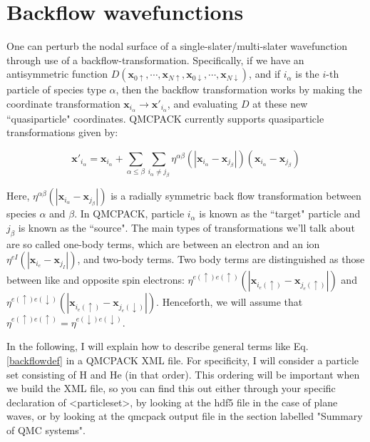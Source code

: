 \section{Backflow wavefunctions}

\label{sec:backflow}

One can perturb the nodal surface of a single-slater/multi-slater wavefunction through use of a backflow-transformation.  Specifically, if we have an antisymmetric function $D(\mathbf{x}_{0\uparrow},\cdots,\mathbf{x}_{N\uparrow}, \mathbf{x}_{0\downarrow},\cdots,\mathbf{x}_{N\downarrow})$, and if $i_\alpha$ is the $i$-th particle of species type $\alpha$, then the backflow transformation works by making the coordinate transformation $\mathbf{x}_{i_\alpha} \to \mathbf{x}'_{i_\alpha}$, and evaluating $D$ at these new ``quasiparticle" coordinates.  QMCPACK currently supports quasiparticle transformations given by:

\begin{equation}\label{backflowdef}
\mathbf{x}'_{i_\alpha}=\mathbf{x}_{i_\alpha}+\sum_{\alpha \leq \beta} \sum_{i_\alpha \neq j_\beta} \eta^{\alpha\beta}(|\mathbf{x}_{i_\alpha}-\mathbf{x}_{j_\beta}|)(\mathbf{x}_{i_\alpha}-\mathbf{x}_{j_\beta})
\end{equation}

Here, $\eta^{\alpha\beta}(|\mathbf{x}_{i_\alpha}-\mathbf{x}_{j_\beta}|)$ is a radially symmetric back flow transformation between species $\alpha$ and $\beta$.  In QMCPACK, particle $i_\alpha$ is known as the ``target" particle and $j_\beta$ is known as the ``source".  The main types of transformations we'll talk about are so called one-body terms, which are between an electron and an ion $\eta^{eI}(|\mathbf{x}_{i_e}-\mathbf{x}_{j_I}|)$, and two-body terms.  Two body terms are distinguished as those between like and opposite spin electrons:  $\eta^{e(\uparrow)e(\uparrow)}(|\mathbf{x}_{i_e(\uparrow)}-\mathbf{x}_{j_e(\uparrow)}|)$ and  $\eta^{e(\uparrow)e(\downarrow)}(|\mathbf{x}_{i_e(\uparrow)}-\mathbf{x}_{j_e(\downarrow)}|)$.  Henceforth, we will assume that $\eta^{e(\uparrow)e(\uparrow)}=\eta^{e(\downarrow)e(\downarrow)}$.

In the following, I will explain how to describe general terms like Eq. \ref{backflowdef} in a QMCPACK XML file.  For specificity, I will consider a particle set consisting of H and He (in that order).  This ordering will be important when we build the XML file, so you can find this out either through your specific declaration of <particleset>, by looking at the hdf5 file in the case of plane waves, or by looking at the qmcpack output file in the section labelled "Summary of QMC systems".  
